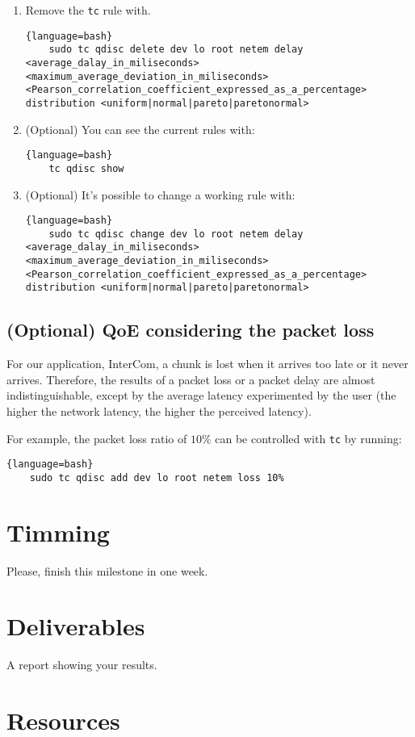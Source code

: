 \begin{enumerate}
\item Remove the \texttt{tc} rule with.
  
  \begin{lstlisting}{language=bash}
    sudo tc qdisc delete dev lo root netem delay <average_dalay_in_miliseconds> <maximum_average_deviation_in_miliseconds> <Pearson_correlation_coefficient_expressed_as_a_percentage> distribution <uniform|normal|pareto|paretonormal>
  \end{lstlisting}

\item (Optional) You can see the current rules with:

  \begin{lstlisting}{language=bash}
    tc qdisc show
  \end{lstlisting}

\item (Optional) It's possible to change a working rule with:

  \begin{lstlisting}{language=bash}
    sudo tc qdisc change dev lo root netem delay <average_dalay_in_miliseconds> <maximum_average_deviation_in_miliseconds> <Pearson_correlation_coefficient_expressed_as_a_percentage> distribution <uniform|normal|pareto|paretonormal>
  \end{lstlisting}
  
\end{enumerate}

\subsection{(Optional) QoE considering the packet loss}

For our application, InterCom, a chunk is lost when it arrives too
late or it never arrives. Therefore, the results of a packet loss or a
packet delay are almost indistinguishable, except by the average
latency experimented by the user (the higher the network latency, the
higher the perceived latency).

For example, the packet loss ratio of $10\%$ can be controlled with
\texttt{tc} by running:

  \begin{lstlisting}{language=bash}
    sudo tc qdisc add dev lo root netem loss 10%
  \end{lstlisting}

\section{Timming}

Please, finish this milestone in one week.

\section{Deliverables}

A report showing your results.

\section{Resources}



